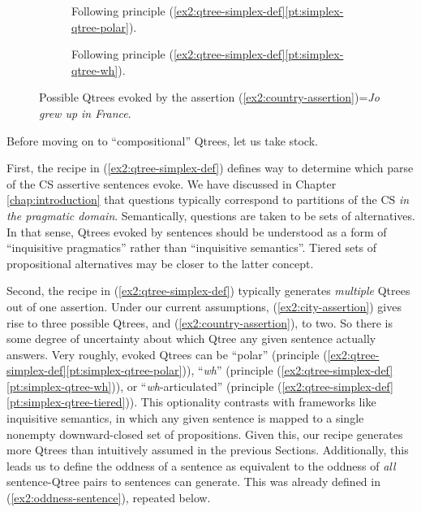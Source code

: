 \begin{figure}[H]
	\centering
	\begin{subfigure}[t]{.45\linewidth}
		\centering
		\caption{Following principle (\ref{ex2:qtree-simplex-def}\ref{pt:simplex-qtree-polar}).}\label{fig2:country-qtree-polar}
	\end{subfigure}
	\hfill
	\begin{subfigure}[t]{.45\linewidth}
		\centering		{}
		\caption{Following principle (\ref{ex2:qtree-simplex-def}\ref{pt:simplex-qtree-wh}).}\label{fig2:country-qtree-wh}
	\end{subfigure}
	\caption{Possible Qtrees evoked by the assertion (\ref{ex2:country-assertion})=\textit{Jo grew up in France}.}
\end{figure}


Before moving on to ``compositional'' Qtrees, let us take stock.

First, the recipe in (\ref{ex2:qtree-simplex-def}) defines way to determine which parse of the CS assertive sentences evoke. We have discussed in Chapter \ref{chap:introduction} that questions typically correspond to partitions of the CS \textit{in the pragmatic domain}. Semantically, questions are taken to be sets of alternatives. In that sense, Qtrees evoked by sentences should be understood as a form of ``inquisitive pragmatics'' rather than ``inquisitive semantics''. Tiered sets of propositional alternatives may be closer to the latter concept.

Second, the recipe in (\ref{ex2:qtree-simplex-def}) typically generates \textit{multiple} Qtrees out of one assertion. Under our current assumptions,  (\ref{ex2:city-assertion}) gives rise to three possible Qtrees, and (\ref{ex2:country-assertion}), to two. So there is some degree of uncertainty about which Qtree any given sentence actually answers. Very roughly, evoked Qtrees can be ``polar'' (principle (\ref{ex2:qtree-simplex-def}\ref{pt:simplex-qtree-polar})), ``\textit{wh}'' (principle (\ref{ex2:qtree-simplex-def}\ref{pt:simplex-qtree-wh})), or ``\textit{wh}-articulated'' (principle (\ref{ex2:qtree-simplex-def}\ref{pt:simplex-qtree-tiered})). This optionality contrasts with frameworks like inquisitive semantics, in which any given sentence is mapped to a single nonempty downward-closed set of propositions. Given this, our recipe generates more Qtrees than intuitively assumed in the previous Sections.  Additionally, this leads us to define the oddness of a sentence as equivalent to the oddness of \textit{all} sentence-Qtree pairs to sentences can generate. This was already defined in (\ref{ex2:oddness-sentence}), repeated below.

